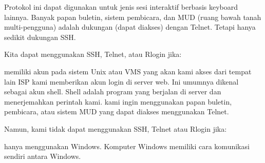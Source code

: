Protokol ini dapat digunakan untuk jenis sesi interaktif berbasis keyboard lainnya. Banyak papan buletin, sistem pembicara, dan MUD (ruang bawah tanah multi-pengguna) adalah dukungan (dapat diakses) dengan Telnet. Tetapi hanya sedikit dukungan SSH.

Kita dapat menggunakan SSH, Telnet, atau Rlogin jika:

    memiliki akun pada sistem Unix atau VMS yang akan kami akses dari tempat lain
    ISP kami memberikan akun login di server web. Ini umumnya dikenal sebagai akun shell. Shell adalah program yang berjalan di server dan menerjemahkan perintah kami.
    kami ingin menggunakan papan buletin, pembicara, atau sistem MUD yang dapat diakses menggunakan Telnet.

Namun, kami tidak dapat menggunakan SSH, Telnet atau Rlogin jika:

    hanya menggunakan Windows. Komputer Windows memiliki cara komunikasi sendiri antara Windows.
